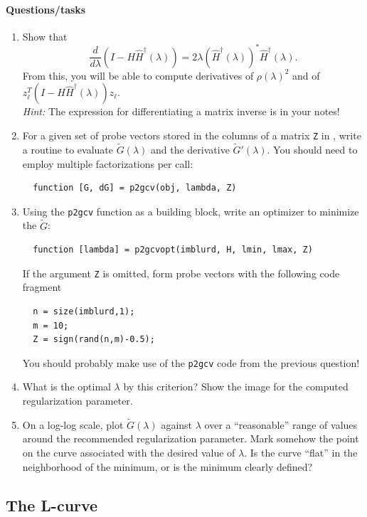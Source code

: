\documentclass[12pt, leqno]{article} %
\begin{document}
\paragraph*{Questions/tasks}
\begin{enumerate}
\item
  Show that
  \[
    \frac{d}{d\lambda} \left( I-H \hat{H}^\dagger(\lambda) \right) =
    2\lambda( \hat{H}^\dagger(\lambda) )^* \hat{H}^\dagger(\lambda).
  \]
  From this, you will be able to compute derivatives of $\rho(\lambda)^2$
  and of $z_\ell^T (I-H \hat{H}^\dagger(\lambda)) z_{\ell}$. \\
  {\em Hint:} The expression for differentiating a matrix inverse
  is in your notes!
\item
  For a given set of probe vectors stored in the columns of a matrix
  {\tt Z} in \matlab, write a routine to evaluate $\tilde{G}(\lambda)$
  and the derivative $\tilde{G}'(\lambda)$.  You should need to employ
  multiple factorizations per call:
\begin{lstlisting}
  function [G, dG] = p2gcv(obj, lambda, Z)
\end{lstlisting}
\item
  Using the {\tt p2gcv} function as a building block, write an optimizer
  to minimize the $\tilde{G}$:
\begin{lstlisting}
  function [lambda] = p2gcvopt(imblurd, H, lmin, lmax, Z)
\end{lstlisting}
  If the argument {\tt Z} is omitted, form probe vectors with the following
  code fragment
\begin{lstlisting}
  n = size(imblurd,1);
  m = 10;
  Z = sign(rand(n,m)-0.5);
\end{lstlisting}
  You should probably make use of the {\tt p2gcv} code from the previous
  question!
\item
  What is the optimal $\lambda$ by this criterion?
  Show the image for the computed regularization parameter.
\item
  On a log-log scale, plot $\tilde{G}(\lambda)$ against $\lambda$ over
  a ``reasonable'' range of values around the recommended
  regularization parameter.  Mark somehow the point on the
  curve associated with the desired value of $\lambda$.  Is
  the curve ``flat'' in the neighborhood of the minimum, or
  is the minimum clearly defined?
\end{enumerate}

\subsection{The L-curve}
\end{document}
